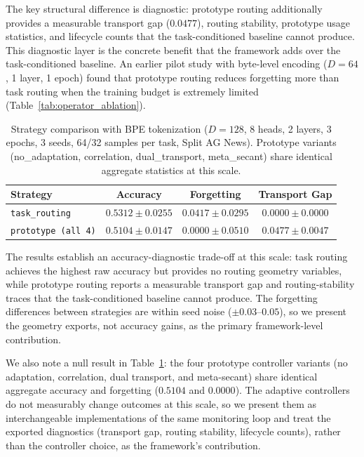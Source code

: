 \documentclass[11pt,a4paper]{article}
\theoremstyle{definition}
\begin{document}
The key structural difference is diagnostic: prototype routing additionally provides a measurable transport gap ($0.0477$), routing stability, prototype usage statistics, and lifecycle counts that the task-conditioned baseline cannot produce. This diagnostic layer is the concrete benefit that the framework adds over the task-conditioned baseline. An earlier pilot study with byte-level encoding ($D=64$, 1 layer, 1 epoch) found that prototype routing reduces forgetting more than task routing when the training budget is extremely limited (Table~\ref{tab:operator_ablation}).

\begin{table}[t]
\centering
\caption{Strategy comparison with BPE tokenization ($D=128$, 8 heads, 2 layers, 3 epochs, 3 seeds, 64/32 samples per task, Split AG News). Prototype variants (no\_adaptation, correlation, dual\_transport, meta\_secant) share identical aggregate statistics at this scale.}
\label{tab:strategy_ablation_main}
\begin{tabular}{lccc}
\toprule
\textbf{Strategy} & \textbf{Accuracy} & \textbf{Forgetting} & \textbf{Transport Gap} \\
\midrule
\texttt{task\_routing} & $\mathbf{0.5312} \pm 0.0255$ & $0.0417 \pm 0.0295$ & $0.0000 \pm 0.0000$ \\
\texttt{prototype (all 4)} & $0.5104 \pm 0.0147$ & $\mathbf{0.0000} \pm 0.0510$ & $0.0477 \pm 0.0047$ \\
\bottomrule
\end{tabular}
\end{table}

The results establish an accuracy-diagnostic trade-off at this scale: task routing achieves the highest raw accuracy but provides no routing geometry variables, while prototype routing reports a measurable transport gap and routing-stability traces that the task-conditioned baseline cannot produce. The forgetting differences between strategies are within seed noise ($\pm 0.03$--$0.05$), so we present the geometry exports, not accuracy gains, as the primary framework-level contribution.

We also note a null result in Table~\ref{tab:strategy_ablation_main}: the four prototype controller variants (no adaptation, correlation, dual transport, and meta-secant) share identical aggregate accuracy and forgetting ($0.5104$ and $0.0000$). The adaptive controllers do not measurably change outcomes at this scale, so we present them as interchangeable implementations of the same monitoring loop and treat the exported diagnostics (transport gap, routing stability, lifecycle counts), rather than the controller choice, as the framework's contribution.
\end{document}
